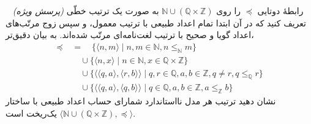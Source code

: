 ~
\emph{(پرسش ویژه)} \;
رابطهٔ دوتایی $\preceq$ را روی $\mathbb{N} \cup (\mathbb{Q} \times \mathbb{Z})$ به صورت یک ترتیب خطّی تعریف کنید که در آن ابتدا تمام اعداد طبیعی با ترتیب معمول، و سپس زوج مرتّب‌های اعداد گویا و صحیح با ترتیب لغت‌نامه‌ای مرتّب شده‌اند. به بیان دقیق‌تر،
\begin{align*}
  \preceq & = \quad \{ \langle n, m \rangle \mid n, m \in \mathbb{N}, n \le_\mathbb{N} m \} \\
  \quad & \quad \cup \{ \langle n, x \rangle \mid n \in \mathbb{N}, x \in \mathbb{Q} \times \mathbb{Z} \} \\
  \quad & \quad \cup \{ \langle \langle q, a \rangle, \langle r, b \rangle \rangle \mid q, r \in \mathbb{Q}, a, b \in \mathbb{Z}, q \neq r, q \le_\mathbb{Q} r \} \\
  \quad & \quad \cup \{ \langle \langle q, a \rangle, \langle q, b \rangle \rangle \mid q \in \mathbb{Q}, a, b \in \mathbb{Z}, a \le_\mathbb{Z} b \}
\end{align*}
نشان دهید ترتیب هر مدل نااستاندارد شمارای حساب اعداد طبیعی با ساختار $\langle \mathbb{N} \cup (\mathbb{Q} \times \mathbb{Z}), \preceq \rangle$ یک‌ریخت است.